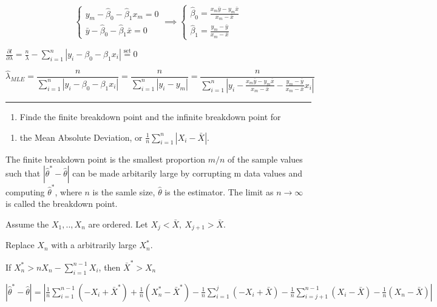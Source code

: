 \documentclass[12pt,]{article}
\providecommand{\tightlist}{%
  \setlength{\itemsep}{0pt}\setlength{\parskip}{0pt}}
\begin{document}
\[\begin{cases}y_m-\hat\beta_0-\hat\beta_1x_m=0\\ \bar y-\hat\beta_0-\hat\beta_1\bar x=0\end{cases}\implies \begin{cases}\hat\beta_0=\frac{x_m\bar y-y_m\bar x}{x_m-\bar x}\\ \hat\beta_1=\frac{y_m-\bar y}{x_m-\bar x}\end{cases}\]

\(\frac{\partial l}{\partial\lambda}=\frac{n}\lambda-\sum_{i=1}^{n}|y_i-\beta_0-\beta_1x_i|\overset{\text{set}}{=}0\)

\[\hat\lambda_{MLE}=\frac{n}{\sum_{i=1}^{n}|y_i-\beta_0-\beta_1x_i|}=\frac{n}{\sum_{i=1}^{n}|y_i-y_m|}=\frac{n}{\sum_{i=1}^{n}|y_i-\frac{x_m\bar y-y_m\bar x}{x_m-\bar x}-\frac{y_m-\bar y}{x_m-\bar x}x_i|}\]

\begin{center}\rule{0.5\linewidth}{\linethickness}\end{center}

\begin{enumerate}
\def\labelenumi{\arabic{enumi}.}
\setcounter{enumi}{2}
\tightlist
\item
  Finde the finite breakdown point and the infinite breakdown point for
\end{enumerate}

\begin{enumerate}
\def\labelenumi{\alph{enumi})}
\tightlist
\item
  the Mean Absolute Deviation, or \(\frac1n\sum_{i=1}^n|X_i-\bar X|\).
\end{enumerate}

The finite breakdown point is the smallest proportion \(m/n\) of the
sample values such that \(|\hat\theta^*-\hat\theta|\) can be made
arbitarily large by corrupting m data values and computing
\(\hat\theta^*\), where \(n\) is the samle size, \(\hat\theta\) is the
estimator. The limit as \(n\to\infty\) is called the breakdown point.

Assume the \(X_1,..,X_n\) are ordered. Let
\(X_j<\bar X,\ X_{j+1}>\bar X\).

Replace \(X_n\) with a arbitrarily large \(X_n^*\).

If \(X_n^*>nX_n-\sum_{i=1}^{n-1}X_i\), then \(\bar X^*>X_n\)

\(|\hat\theta^*-\hat\theta|=|\frac1n\sum_{i=1}^{n-1}(-X_i+\bar X^*)+\frac1n(X_n^*-\bar X^*)-\frac1n\sum_{i=1}^{j}(-X_i+\bar X)-\frac1n\sum_{i=j+1}^{n-1}(X_i-\bar X)-\frac1n(X_n-\bar X)|\)
\end{document}
